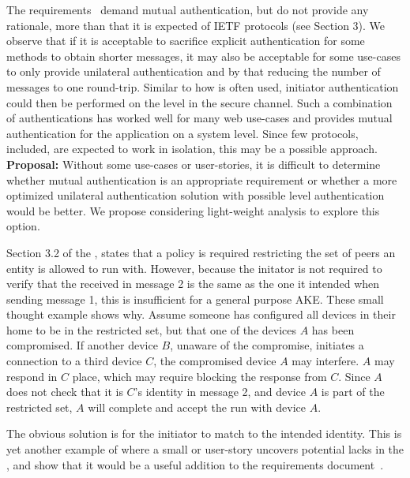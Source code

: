 \documentclass[runningheads,draft,x11names]{llncs}
\begin{document}
The requirements~\cite{ietf-lake-reqs-04} demand mutual authentication, but
do not provide any rationale, more than that it is expected of IETF protocols
(see Section 3).
%
We observe that if it is acceptable to sacrifice explicit authentication for
some methods to obtain shorter messages, it may also be acceptable for some
use-cases to only provide unilateral authentication and by that reducing the
number of messages to one round-trip.
%
Similar to how \mTls{} is often used, initiator authentication could then be
performed on the \mCoap{} level in the secure \mOscore{} channel.
%
Such a combination of authentications has worked well for many web
use-cases and provides mutual authentication for the application on a system
level.
%
Since few protocols, \mEdhoc{} included, are expected to work in isolation, this
may be a possible approach.
%
\textbf{Proposal:} Without some use-cases or user-stories, it is difficult to
determine whether mutual authentication is an appropriate requirement or whether
a more optimized unilateral authentication solution with possible \mCoap{} level
authentication would be better.
%
We propose considering light-weight  analysis to explore this option.
%

Section 3.2 of the \mSpec, states that a policy is required restricting the set
of peers an entity is allowed to run \mEdhoc{} with.
%
However, because the initator is not required to verify that the \mIdcredr{}
received in message 2 is the same as the one it intended when sending message 1,
this is insufficient for a general purpose AKE.
%
These small thought example shows why.
%
Assume someone has configured all devices in their home to be in the restricted
set, but that one of the devices $A$ has been compromised.
%
If another device $B$, unaware of the compromise, initiates a connection to a
third device $C$, the compromised device $A$ may interfere.
%
$A$ may respond in $C$ place, which may require blocking the response from $C$.
%
Since $A$ does not check that it is $C$'s identity in message 2, and device $A$
is part of the restricted set, $A$ will complete and accept the \mEdhoc{} run with
device $A$.

%
The obvious solution is for the initiator to match \mIdcredr{} to the intended
identity.
%
This is yet another example of where a small  or user-story uncovers
potential lacks in the \mSpec, and show that it would be a useful addition to
the requirements document~\cite{ietf-lake-reqs-04}.
\end{document}
